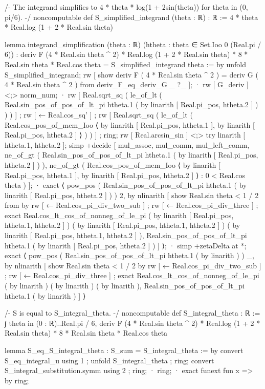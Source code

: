 /-
The integrand simplifies to 4 * theta * log(1 + 2sin(theta)) for theta in (0, pi/6).
-/
noncomputable def S_simplified_integrand (theta : ℝ) : ℝ := 4 * theta * Real.log (1 + 2 * Real.sin theta)

lemma integrand_simplification (theta : ℝ) (htheta : theta ∈ Set.Ioo 0 (Real.pi / 6)) :
  deriv F (4 * Real.sin theta ^ 2) * Real.log (1 + 2 * Real.sin theta) * 8 * Real.sin theta * Real.cos theta = S_simplified_integrand theta := by
    unfold S_simplified_integrand;
    rw [ show deriv F ( 4 * Real.sin theta ^ 2 ) = deriv G ( 4 * Real.sin theta ^ 2 ) from deriv_F_eq_deriv_G _ ?_ ];
    · rw [ G_deriv ] <;> norm_num;
      · rw [ Real.sqrt_sq ( le_of_lt ( Real.sin_pos_of_pos_of_lt_pi htheta.1 ( by linarith [ Real.pi_pos, htheta.2 ] ) ) ) ] ; rw [ ← Real.cos_sq' ] ; rw [ Real.sqrt_sq ( le_of_lt ( Real.cos_pos_of_mem_Ioo ⟨ by linarith [ Real.pi_pos, htheta.1 ], by linarith [ Real.pi_pos, htheta.2 ] ⟩ ) ) ] ; ring;
        rw [ Real.arcsin_sin ] <;> try linarith [ htheta.1, htheta.2 ];
        simp +decide [ mul_assoc, mul_comm, mul_left_comm, ne_of_gt ( Real.sin_pos_of_pos_of_lt_pi htheta.1 ( by linarith [ Real.pi_pos, htheta.2 ] ) ), ne_of_gt ( Real.cos_pos_of_mem_Ioo ⟨ by linarith [ Real.pi_pos, htheta.1 ], by linarith [ Real.pi_pos, htheta.2 ] ⟩ : 0 < Real.cos theta ) ];
      · exact ⟨ pow_pos ( Real.sin_pos_of_pos_of_lt_pi htheta.1 ( by linarith [ Real.pi_pos, htheta.2 ] ) ) 2, by nlinarith [ show Real.sin theta < 1 / 2 from by rw [ ← Real.cos_pi_div_two_sub ] ; rw [ ← Real.cos_pi_div_three ] ; exact Real.cos_lt_cos_of_nonneg_of_le_pi ( by linarith [ Real.pi_pos, htheta.1, htheta.2 ] ) ( by linarith [ Real.pi_pos, htheta.1, htheta.2 ] ) ( by linarith [ Real.pi_pos, htheta.1, htheta.2 ] ), Real.sin_pos_of_pos_of_lt_pi htheta.1 ( by linarith [ Real.pi_pos, htheta.2 ] ) ] ⟩;
    · simp +zetaDelta at *;
      exact ⟨ pow_pos ( Real.sin_pos_of_pos_of_lt_pi htheta.1 ( by linarith ) ) _, by nlinarith [ show Real.sin theta < 1 / 2 by rw [ ← Real.cos_pi_div_two_sub ] ; rw [ ← Real.cos_pi_div_three ] ; exact Real.cos_lt_cos_of_nonneg_of_le_pi ( by linarith ) ( by linarith ) ( by linarith ), Real.sin_pos_of_pos_of_lt_pi htheta.1 ( by linarith ) ] ⟩

/-
S is equal to S_integral_theta.
-/
noncomputable def S_integral_theta : ℝ := ∫ theta in (0 : ℝ)..Real.pi / 6, deriv F (4 * Real.sin theta ^ 2) * Real.log (1 + 2 * Real.sin theta) * 8 * Real.sin theta * Real.cos theta

lemma S_eq_S_integral_theta : S_sum = S_integral_theta := by
  convert S_eq_integral_u using 1 ; unfold S_integral_theta ; ring;
  convert S_integral_substitution.symm using 2 ; ring;
  · ring;
  · exact funext fun x => by ring;


